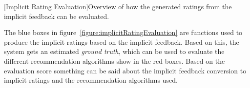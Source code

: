 \begin{center}
    [Implicit Rating Evaluation]{Overview of how the generated ratings from the implicit feedback can be evaluated.}
  	\label{figure:implicitRatingEvaluation}
  \end{center}

The blue boxes in figure~\ref{figure:implicitRatingEvaluation} are functions used to produce the implicit ratings based on the implicit feedback. Based on this, the system gets an estimated \emph{ground truth}, which can be used to evaluate the different recommendation algorithms show in the red boxes. Based on the evaluation score something can be said about the implicit feedback conversion to implicit ratings and the recommendation algorithms used.








